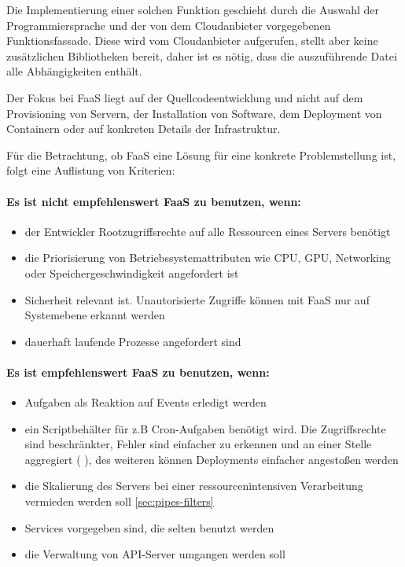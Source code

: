 \documentclass[
12pt,
english,
ngerman,
headsepline,
twoside,
openright,
numbers=noenddot,version=first
]{scrreprt}
\begin{document}
Die Implementierung einer solchen Funktion geschieht durch die Auswahl der Programmiersprache und der von dem Cloudanbieter vorgegebenen Funktionsfassade. Diese wird vom Cloudanbieter aufgerufen, stellt aber keine zusätzlichen Bibliotheken bereit, daher ist es nötig, dass die auszuführende Datei alle Abhängigkeiten enthält.


Der Fokus bei \acrshort{FaaS} liegt auf der Quellcodeentwicklung und nicht auf dem Provisioning von Servern, der Installation von Software, dem Deployment von Containern oder auf konkreten Details der Infrastruktur.


Für die Betrachtung, ob \acrshort{FaaS} eine Lösung für eine konkrete Problemstellung ist, folgt eine Auflistung von Kriterien:
\paragraph{Es ist nicht empfehlenswert \acrshort{FaaS} zu benutzen, wenn:}\label{lambda-yes-no}
\begin{itemize}
	\item der Entwickler Rootzugriffsrechte auf alle Ressourcen eines Servers benötigt
	\item die Priorisierung von Betriebssystemattributen wie CPU, GPU, Networking oder Speichergeschwindigkeit angefordert ist
	\item Sicherheit relevant ist. Unautorisierte Zugriffe können mit \acrshort{FaaS} nur auf Systemebene erkannt werden
	\item dauerhaft laufende Prozesse angefordert sind
\end{itemize}
\paragraph{Es ist empfehlenswert \acrshort{FaaS} zu benutzen, wenn:}
\begin{itemize}
	\item Aufgaben als Reaktion auf Events erledigt werden
	\item ein Scriptbehälter für z.B Cron-Aufgaben benötigt wird. Die Zugriffsrechte sind beschränkter, Fehler sind einfacher zu erkennen und an einer Stelle aggregiert ( \cite{awsCloudWatch} ), des weiteren können Deployments einfacher angestoßen werden
	\item die Skalierung des Servers bei einer ressourcenintensiven Verarbeitung vermieden werden soll \autoref{sec:pipes-filters}
	\item Services vorgegeben sind, die selten benutzt werden
	\item die Verwaltung von \acrshort{API}-Server umgangen werden soll
\end{itemize}\cite{lambdaAWS}
\end{document}
